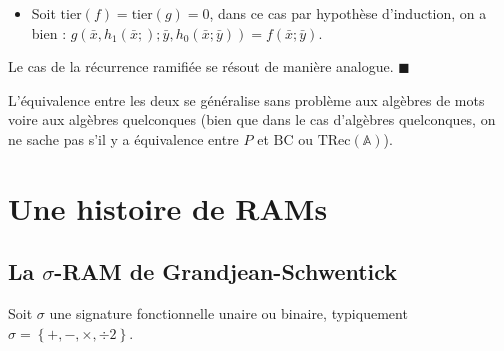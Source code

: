 \documentclass{article}
\newcommand{\TRec}[1]{\text{TRec}\left(\mathbb{#1}\right)}
\begin{document}
\begin{demo}
\begin{itemize}[itemsep=-1mm]
				\item 	Soit $\text{tier}(f) = \text{tier}(g) = 0$, dans ce cas par hypothèse d'induction, on a bien : $g( \bar{x}, h_1(\bar{x};) ; \bar{y}, h_0(\bar{x}; \bar{y})) = f(\bar{x} ; \bar{y})$.
			\end{itemize}
			
			Le cas de la récurrence ramifiée se résout de manière analogue. $\blacksquare$
		\end{demo}
		

		L'équivalence entre les deux se généralise sans problème aux algèbres de mots voire aux algèbres quelconques (bien que dans le cas d'algèbres quelconques, on ne sache pas s'il y a équivalence entre $P$ et $\text{BC}$ ou $\TRec{A}$).
		
		








	\pagebreak
	
	\section{Une histoire de RAMs}
	

	
		\subsection{La $\sigma$-RAM de Grandjean-Schwentick}
		
		
		Soit $\sigma$ une signature fonctionnelle unaire ou binaire, typiquement $\sigma = \left\lbrace +, -, \times, \div 2\right\rbrace$.
		
\end{document}
